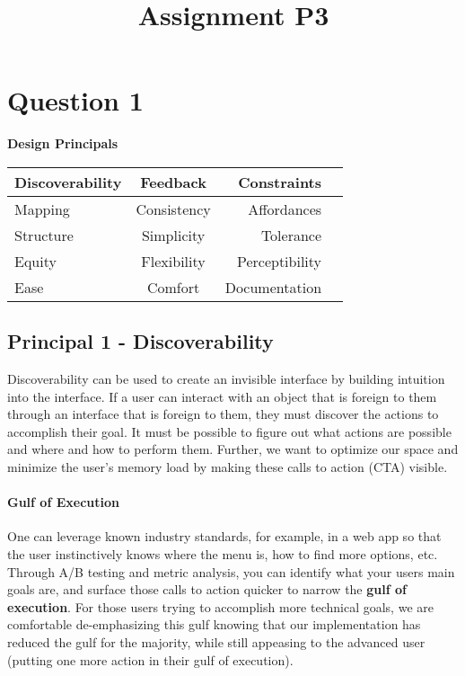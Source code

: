 

\title{Assignment P3\\}



\maketitle
\thispagestyle{fancy}

\section{Question 1}
\textbf{Design Principals}

\begin{table}[H]
  \centering
  \begin{tabular}{@{}lcrl@{}}
    Discoverability & Feedback & Constraints\\
    \midrule
    Mapping & Consistency & Affordances\\
    \midrule
    Structure & Simplicity & Tolerance\\
    \midrule
    Equity & Flexibility & Perceptibility\\
    \midrule
    Ease & Comfort & Documentation\\
    \midrule
  \end{tabular}
\end{table}

\subsection{Principal 1 - Discoverability}
Discoverability can be used to create an invisible interface by building intuition into the interface. If a user can interact with an object that is foreign to them through an interface that is foreign to them, they must discover the actions to accomplish their goal. It must be possible to figure out what actions are possible and where and how to perform them. Further, we want to optimize our space and minimize the user's memory load by making these calls to action (CTA) visible.

\paragraph{Gulf of Execution}
One can leverage known industry standards, for example, in a web app so that the user instinctively knows where the menu is, how to find more options, etc. Through A/B testing and metric analysis, you can identify what your users main goals are, and surface those calls to action quicker to narrow the \textbf{gulf of execution}. For those users trying to accomplish more technical goals, we are comfortable de-emphasizing this gulf knowing that our implementation has reduced the gulf for the majority, while still appeasing to the advanced user (putting one more action in their gulf of execution).

